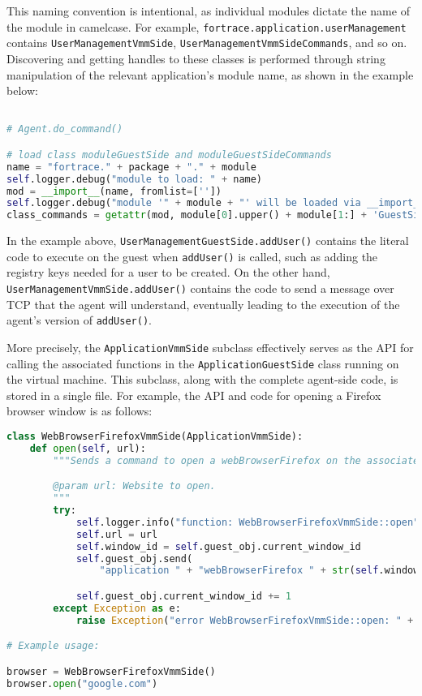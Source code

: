 \documentclass[letterpaper,12pt]{report}
\newcommand{\passthrough}[1]{#1}
\begin{document}
This naming convention is intentional, as individual modules dictate the
name of the module in camelcase. For example,
\passthrough{\lstinline!fortrace.application.userManagement!} contains
\passthrough{\lstinline!UserManagementVmmSide!},
\passthrough{\lstinline!UserManagementVmmSideCommands!}, and so on.
Discovering and getting handles to these classes is performed through
string manipulation of the relevant application's module name, as shown
in the example below:

\begin{lstlisting}[language=Python]

# Agent.do_command()

# load class moduleGuestSide and moduleGuestSideCommands
name = "fortrace." + package + "." + module
self.logger.debug("module to load: " + name)
mod = __import__(name, fromlist=[''])
self.logger.debug("module '" + module + "' will be loaded via __import__")
class_commands = getattr(mod, module[0].upper() + module[1:] + 'GuestSideCommands')
\end{lstlisting}

In the example above,
\passthrough{\lstinline!UserManagementGuestSide.addUser()!} contains the
literal code to execute on the guest when
\passthrough{\lstinline!addUser()!} is called, such as adding the
registry keys needed for a user to be created. On the other hand,
\passthrough{\lstinline!UserManagementVmmSide.addUser()!} contains the
code to send a message over TCP that the agent will understand,
eventually leading to the execution of the agent's version of
\passthrough{\lstinline!addUser()!}.

More precisely, the \passthrough{\lstinline!ApplicationVmmSide!}
subclass effectively serves as the API for calling the associated
functions in the \passthrough{\lstinline!ApplicationGuestSide!} class
running on the virtual machine. This subclass, along with the complete
agent-side code, is stored in a single file. For example, the API and
code for opening a Firefox browser window is as follows:

\begin{lstlisting}[language=Python]
class WebBrowserFirefoxVmmSide(ApplicationVmmSide):
    def open(self, url):
        """Sends a command to open a webBrowserFirefox on the associated guest.

        @param url: Website to open.
        """
        try:
            self.logger.info("function: WebBrowserFirefoxVmmSide::open")
            self.url = url
            self.window_id = self.guest_obj.current_window_id
            self.guest_obj.send(
                "application " + "webBrowserFirefox " + str(self.window_id) + " open " + self.webBrowserFirefox + " " + self.url)

            self.guest_obj.current_window_id += 1
        except Exception as e:
            raise Exception("error WebBrowserFirefoxVmmSide::open: " + str(e))

# Example usage:

browser = WebBrowserFirefoxVmmSide()
browser.open("google.com")
\end{lstlisting}
\end{document}
